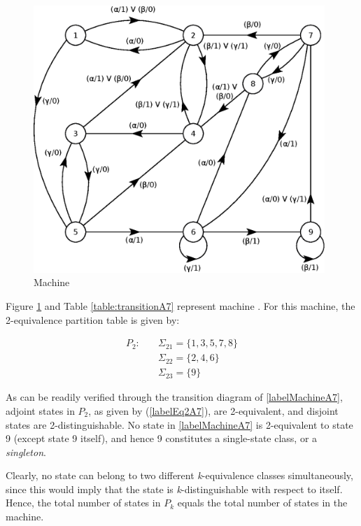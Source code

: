 \documentclass[a4paper]{report}
\begin{document}
    \incSampleMachine
    \begin{figure}[!h]
        \centering
        \includegraphics[width=312pt,clip]{images/eps/machineA7}
        \caption{Machine \sampleMachine}
        \label{fig:machineA7}
    \end{figure}

    Figure \ref{fig:machineA7} and Table \ref{table:transitionA7} represent machine \sampleMachine \label{labelMachineA7}. For this machine, the 2-equivalence partition table is given by:

    \begin{align} \label{labelEq2A7}
        {P_2:} \quad{} &\Sigma_{21} = \{1,3,5,7,8\} \nonumber \\
        &\Sigma_{22} = \{2,4,6\} \nonumber \\
        &\Sigma_{23} = \{9\}
    \end{align}

    As can be readily verified through the transition diagram of \ref{labelMachineA7}, adjoint states in $P_2$, as given by (\ref{labelEq2A7}), are 2-equivalent, and disjoint states are 2-distinguishable. No state in \ref{labelMachineA7} is 2-equivalent to state 9 (except state 9 itself), and hence 9 constitutes a single-state class, or a \emph{singleton}.

    Clearly, no state can belong to two different \emph{k}-equivalence classes simultaneously, since this would imply that the state is \emph{k}-distinguishable with respect to itself. Hence, the total number of states in $P_k$ equals the total number of states in the machine.
\end{document}
